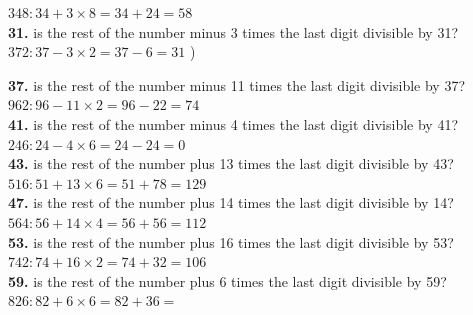 \documentclass{article}
\begin{document}
\hspace{2ex}$348: 34 + 3 \times 8 = 34 + 24 = 58$ \Checkmark\\

\textbf{31.} is the rest of the number minus 3 times the last digit divisible by 31?\\

\hspace{2ex}$372: 37 - 3 \times 2 = 37 - 6 = 31$ \Checkmark)\\

\newpage

\textbf{37.} is the rest of the number minus 11 times the last digit divisible by 37?\\

\hspace{2ex}$962: 96 - 11 \times 2 = 96 - 22 = 74$ \Checkmark\\

\textbf{41.} is the rest of the number minus 4 times the last digit divisible by 41?\\

\hspace{2ex}$246: 24 - 4 \times 6 = 24 - 24 = 0$ \Checkmark\\

\textbf{43.} is the rest of the number plus 13 times the last digit divisible by 43?\\

\hspace{2ex}$516: 51 + 13 \times 6 = 51 + 78 = 129$ \Checkmark\\

\textbf{47.} is the rest of the number plus 14 times the last digit divisible by 14?\\

\hspace{2ex}$564: 56 + 14 \times 4 = 56 + 56 = 112$ \Checkmark\\

\textbf{53.} is the rest of the number plus 16 times the last digit divisible by 53?\\

\hspace{2ex}$742: 74 + 16 \times 2 = 74 + 32 = 106$ \Checkmark\\

\textbf{59.} is the rest of the number plus 6 times the last digit divisible by 59?\\

\hspace{2ex}$826: 82 + 6 \times 6 = 82 + 36 = $ \Checkmark\\
\end{document}
